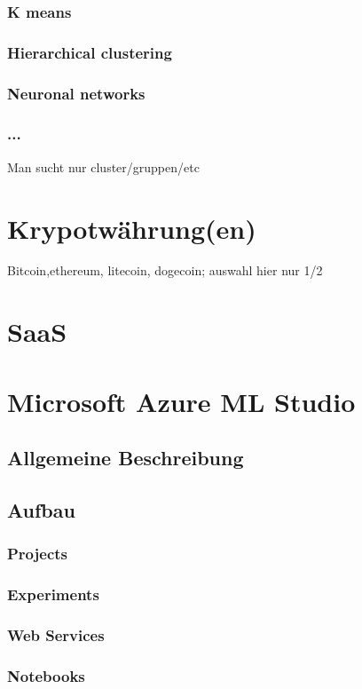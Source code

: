 \subsubsection{K means}
\subsubsection{Hierarchical clustering}
\subsubsection{Neuronal networks}
\subsubsection{...}
Man sucht nur cluster/gruppen/etc




\section{Krypotwährung(en)}
Bitcoin,ethereum, litecoin, dogecoin; auswahl hier nur 1/2


\section{SaaS}
\section{Microsoft Azure ML Studio}
\subsection{Allgemeine Beschreibung}
\subsection{Aufbau }
\subsubsection{Projects}
\subsubsection{Experiments}
\subsubsection{Web Services}
\subsubsection{Notebooks}
